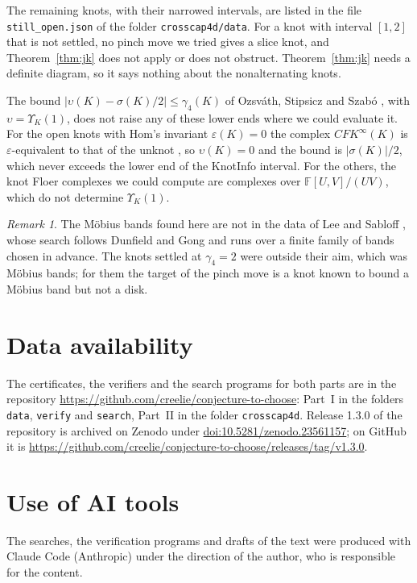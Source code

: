\documentclass[11pt]{amsart}
\theoremstyle{definition}
\theoremstyle{remark}
\newtheorem{remark}[theorem]{Remark}
\numberwithin{equation}{section}
\newcommand{\F}{\mathbb{F}}
\begin{document}
The remaining \nopen{} knots, with their narrowed intervals, are listed in the
file \texttt{still\_open.json} of the folder \texttt{crosscap4d/data}. For a knot with interval $[1,2]$ that is not
settled, no pinch move we tried gives a slice knot, and Theorem~\ref{thm:jk} does not apply
or does not obstruct. Theorem~\ref{thm:jk} needs a definite diagram, so it says nothing
about the nonalternating knots.

The bound $|\upsilon(K)-\sigma(K)/2|\le\gamma_4(K)$ of Ozsv\'ath, Stipsicz and Szab\'o
\cite{OSS}, with $\upsilon=\Upsilon_K(1)$, does not raise any of these lower ends where we
could evaluate it. For the open knots with Hom's invariant $\varepsilon(K)=0$ the complex
$CFK^\infty(K)$ is $\varepsilon$-equivalent to that of the unknot \cite{Hom}, so
$\upsilon(K)=0$ and the bound is $|\sigma(K)|/2$, which never exceeds the lower end of the
KnotInfo interval. For the others, the knot Floer complexes we could compute are complexes over
$\F[U,V]/(UV)$, which do not determine $\Upsilon_K(1)$.

\begin{remark}
The \nclosedone{} M\"obius bands found here are not in the data of Lee and Sabloff
\cite{LS}, whose search follows Dunfield and Gong \cite{DG} and runs over a finite family of
bands chosen in advance. The knots settled at $\gamma_4=2$ were outside their aim, which was
M\"obius bands; for them the target of the pinch move is a knot known to bound a M\"obius
band but not a disk.
\end{remark}

\section*{Data availability}
The certificates, the verifiers and the search programs for both parts are in the
repository \url{https://github.com/creelie/conjecture-to-choose}: Part~I in the folders
\texttt{data}, \texttt{verify} and \texttt{search}, Part~II in the folder \texttt{crosscap4d}.
Release 1.3.0 of the repository is archived on Zenodo under
\href{https://doi.org/10.5281/zenodo.23561157}{doi:10.5281/zenodo.23561157}; on GitHub it is
\url{https://github.com/creelie/conjecture-to-choose/releases/tag/v1.3.0}.

\section*{Use of AI tools}
The searches, the verification programs and drafts of the text were produced with Claude
Code (Anthropic) under the direction of the author, who is responsible for the
content.
\end{document}
